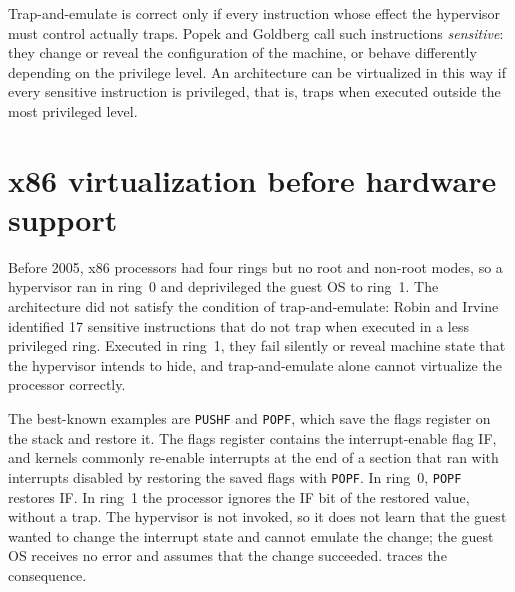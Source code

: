 \documentclass[../main.tex]{subfiles}
\begin{document}
\begin{note}
  Trap-and-emulate is correct only if every instruction whose effect the
  hypervisor must control actually traps.  Popek and Goldberg
  \cite{popek1974} call such instructions \emph{sensitive}: they change or
  reveal the configuration of the machine, or behave differently depending
  on the privilege level.  An architecture can be virtualized in this way
  if every sensitive instruction is privileged, that is, traps when
  executed outside the most privileged level.
\end{note}

\section{x86 virtualization before hardware support}
\label{sec:l12-x86}

Before 2005, x86 processors had four rings but no root and non-root modes,
so a hypervisor ran in ring~0 and deprivileged the guest OS to
ring~1.
The architecture did not satisfy the condition of trap-and-emulate: Robin
and Irvine \cite{robin2000} identified 17 sensitive instructions that do not
trap when executed in a less privileged ring.  Executed in ring~1, they fail
silently or reveal machine state that the hypervisor intends to hide, and
trap-and-emulate alone cannot virtualize the processor correctly.

The best-known examples are \texttt{PUSHF} and \texttt{POPF}, which save
the flags register on the stack and restore it.  The flags register
contains the interrupt-enable flag IF, and kernels commonly re-enable
interrupts at the end of a section that ran with interrupts disabled by
restoring the saved flags with \texttt{POPF}.  In ring~0, \texttt{POPF}
restores IF.  In ring~1 the processor ignores the IF bit of the restored
value, without a trap.  The hypervisor is not invoked, so it does
not learn that the guest wanted to change the interrupt state and cannot
emulate the change; the guest OS receives no error and assumes that the
change succeeded.   traces the consequence.
\end{document}
